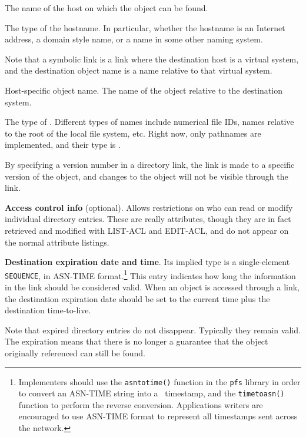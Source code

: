 \begin{description}
\item[] The name of the host on which the
object can be found. 

\item[]  The type of
the hostname.  In particular, whether the hostname is an Internet
address, a domain style name, or a name in some other naming system.

Note that a symbolic link is a link where the destination host is a
virtual system, and the destination object name is a name relative to
that virtual system.

\item[] Host-specific object name. The name of the object
relative to the destination system.  

\item[] The
type of . Different types of names include numerical file IDs,
names relative to the root of the local file system, etc.  Right now,
only pathnames are implemented, and their type is .

\item[] By specifying a version number
in a directory link, the link is made to a specific version of the
object, and changes to the object will not be visible through the
link.

\item {\bf Access control info} (optional). Allows restrictions on who can
read or modify individual directory entries.  These are really
attributes, though they are in fact retrieved and modified with LIST-ACL and
EDIT-ACL, and do not appear on the normal attribute listings.

\item[\atr{dest-exp}] {\bf Destination expiration date and time}.  Its
implied type is a single-element {\tt SEQUENCE}, in ASN-TIME format.\footnote{
	Implementers should use the {\tt asntotime()} function in the
{\tt pfs} library in order to convert an ASN-TIME string into a
\unix\  timestamp, and the {\tt timetoasn()} function to perform the
reverse conversion.  Applications writers are encouraged to use
ASN-TIME format to represent all timestamps sent across the network.
}
This entry indicates how long 
the information in the link should be considered valid.  When an
object is accessed through a link, the destination expiration date
should be set to the current time plus the destination time-to-live.

Note that expired directory entries do not disappear.  Typically they
remain valid.  The expiration means that there is no longer a
guarantee that the object originally referenced can still be found.
   

\end{description}
